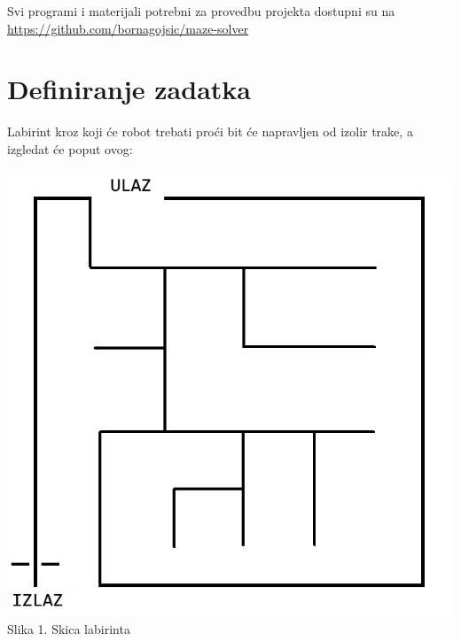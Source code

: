 \vspace{3mm}

Svi programi i materijali potrebni za provedbu projekta dostupni su na \href{https://github.com/bornagojsic/maze-solver}{https://github.com/bornagojsic/maze-solver}

\section{Definiranje zadatka}

Labirint kroz koji će robot trebati proći bit će napravljen od izolir trake, a izgledat će poput ovog:

\vspace{3mm}

\includegraphics[scale=0.5]{maze}
Slika 1. Skica labirinta

